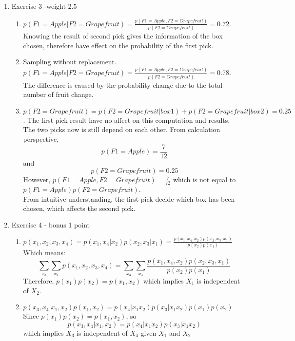 \documentclass{article}
\begin{document}
\begin{enumerate}
\begin{enumerate}
\end{enumerate}
\item Exercise 3 -weight 2.5
\begin{enumerate}
\item $p(F1=Apple | F2=Grapefruit)=\frac{p(F1=Apple,F2=Grapefruit)}{p(F2=Grapefruit)}=0.72$.\\
Knowing the result of second pick gives the information of the box chosen, therefore have effect on the probability of the first pick.
\item Sampling without replacement.\\
$p(F1=Apple | F2=Grapefruit)=\frac{p(F1=Apple,F2=Grapefruit)}{p(F2=Grapefruit)}=0.78$.\\
The difference is caused by the probability change due to the total number of fruit change.
\item $p(F2=Grapefruit)=p(F2=Grapefruit | box1)+p(F2=Grapefruit | box2) = 0.25$. The first pick result have no affect on this computation and results.\\
The two picks now is still depend on each other. From calculation perspective, \[p(F1=Apple)=\frac{7}{12}\] and \[p(F2=Grapefruit)=0.25\] However, $p(F1=Apple,F2=Grapefruit)=\frac{7}{72}$ which is not equal to $p(F1=Apple)p(F2=Grapefruit)$.\\
From intuitive understanding, the first pick decide which box has been chosen, which affects the second pick.
\end{enumerate}
\item Exercise 4 - bonus 1 point
\begin{enumerate}
\item $p(x_{1},x_{2},x_{3},x_{4})=p(x_{1},x_{4}|x_{2})p(x_{2},x_{3}|x_{1})=\frac{p(x_{1},x_{4},x_{2})p(x_{2},x_{3},x_{1})}{p(x_{2})p(x_{1})}$\\ Which means:\[\sum_{x_{3}}\sum_{x_{4}}p(x_{1},x_{2},x_{3},x_{4})=\sum_{x_{3}}\sum_{x_{4}}\frac{p(x_{1},x_{4},x_{2})p(x_{2},x_{3},x_{1})}{p(x_{2})p(x_{1})}\]
Therefore, $p(x_{1})p(x_{2})=p(x_{1},x_{2})$ which implies $X_{1}$ is independent of $X_{2}$.
\item $p(x_{3},x_{4}|x_{1},x_{2})p(x_{1},x_{2})=p(x_{4}|x_{1}x_{2})p(x_{3}|x_{1}x_{2})p(x_{1})p(x_{2})$\\ Since $p(x_{1})p(x_{2})=p(x_{1},x_{2})$, so \[p(x_{3},x_{4}|x_{1},x_{2})=p(x_{4}|x_{1}x_{2})p(x_{3}|x_{1}x_{2})\] which implies $X_{3}$ is independent of $X_{4}$ given $X_{1}$ and $X_{2}$
\end{enumerate}

\end{enumerate}
\end{document}
